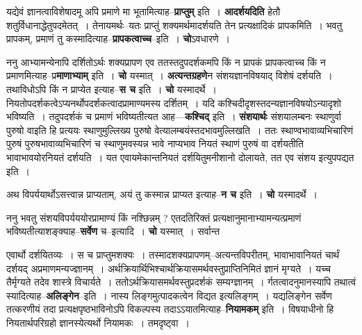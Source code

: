 \documentclass[article,12pt,a4paper]{memoir}
\begin{document}
	  \pstart यद्येवं ज्ञानत्वाविशेषादमू अपि प्रमाणे मा भूतामित्याह--\textbf{प्राप्तुम्} इति । \textbf{आदर्शयदिति} हेतौ शतुर्विधानाद्धेतुपदमेतत् । तेनायमर्थः--यतः प्राप्तुं शक्यमर्थमादर्शयति तेन प्रत्यक्षादिकं प्रापकमिति । भवतु प्रापकम्, प्रमाणं तु कस्मादित्याह--\textbf{प्रापकत्वाच्च}--इति । \textbf{चो}ऽवधारणे ।
	\pend
      

	  \pstart ननु आभ्यामन्येनापि दर्शितोऽर्थः शक्यप्रापण एव ततस्तदुपदर्शकमपि किं न प्रापकं प्रापकत्वाच्च किं न प्रमाणमित्याह--प्र\textbf{माणाभ्याम्} इति । \textbf{चो} यस्मात् । \textbf{अत्यन्तग्रहणे}न संशयज्ञानविषयाद् विशेषं दर्शयति । तथाविधोऽपि किं न प्राप्येत इत्याह--\textbf{स च} इति । \textbf{चो} यस्मादर्थे । नियतोपदर्शकत्वेऽप्यनर्थोपदर्शकत्वादप्रामाण्यमस्य दर्शितम् । यदि कश्चिदीदृशस्तदन्यज्ञानविषयोऽन्यादृशो भविष्यति । तदुपदर्शकं च प्रमाणं भविष्यतीत्यत आह—\textbf{कश्चिद्} इति । \textbf{संशयार्थः} संशयालम्बनः स्थाणुर्वा पुरुषो वाइति हि प्रत्ययः स्थाणुमुल्लिख्य पुरुषो वेत्यालम्बयंस्तदभावमुल्लिखति । ततः स्थाण्वभावाव्यभिचारिणं पुरुषं पुरुषभावाव्यभिचारिणं च स्थाणुमवस्यन्न भावे नाप्यभाव नियतं स्थाणं पुरुषं वा दर्शयतीति भावाभावयोरनियतं दर्शयति । यत एवायमेकान्तनियतं दर्शयितुमनीशानो दोलायते, तत एव संशय इत्युपपद्यत इति ।
	\pend
      

	  \pstart अथ विपर्ययार्थोऽसत्त्वान्न प्राप्यताम्, अयं तु कस्मान्न प्राप्यत इत्याह--\textbf{न च} इति । \textbf{चो} यस्मादर्थे ।
	\pend
      

	  \pstart ननु भवतु संशयविपर्यययोरप्रामाण्यं\leavevmode{} किं नश्छिन्नम् ? एतदतिरिक्तं प्रत्यक्षानुमानाभ्यामन्यत्प्रमाणं भविष्यतीत्याशङ्क्याह--\textbf{सर्वेण} च--इत्यादि । \textbf{चो} यस्मात् । सर्वान्त  \leavevmode{} 
	  
	एवार्थो दर्शयितव्यः । स च प्राप्तुमशक्यः । तस्मादशक्यप्रापणम्--अत्यन्तविपरीतम्, भावाभावानियतं चार्थं दर्शयद् अप्रमाणमन्यज्ज्ञानम् । अर्थक्रियार्थिभिश्चार्थक्रियासमर्थवस्तुप्राप्तिनिमितं ज्ञानं मृग्यते । यच्च तैर्मृग्यते तदेव शास्त्रे विचार्यते । ततोऽर्थक्रियासमर्थवस्तुप्रदर्शकं सम्यग्ज्ञानम् । र्गतत्वादनुमानस्यापि तथात्वं स्यादित्याह--\textbf{अलिङ्गेन}--इति । नास्य लिङ्गमुत्पादकत्वेन विद्यत इत्यलिङ्गम् । यद्यलिङ्गेन सर्वेण तत्करणीयं तदा प्रत्यक्षपृष्ठभाविनोऽपि विकल्पस्य तदाऽऽयातमित्याह--\textbf{नियामकम्} इति । विषयाधीनो हि नियतार्थपरिग्रहो ज्ञानस्येत्यर्थो नियामकः । तमदृष्ट्वा ।
	\pend
      
\end{document}
